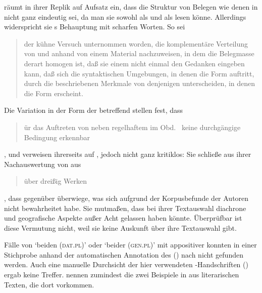 \citet[187]{gjelsten1980} räumt in ihrer Replik auf 
Aufsatz ein, dass die Struktur von Belegen wie denen in 
nicht ganz eindeutig sei, da man sie sowohl als  und als  lesen
könne. Allerdings widerspricht sie \citeauthor{askedal1974}s Behauptung mit
scharfen Worten. So sei \blockcquote[196]{gjelsten1980}{der kühne Versuch
unternommen worden, die komplementäre Verteilung
von  und  anhand von einem Material nachzuweisen, in dem
die Belegmasse derart homogen ist, daß sie einem nicht einmal den Gedanken
eingeben kann, daß sich die syntaktischen Umgebungen, in denen die Form
 auftritt, durch die beschriebenen Merkmale von denjenigen
unterscheiden, in denen die Form  erscheint.}

Die Variation in der Form der  betreffend stellen
\citet[628]{ksw2} fest, dass \blockquote{ür das Auftreten von
 neben regelhaftem  im Obd.\ \textelp{} keine
durchgängige Bedingung erkennbar }, und verweisen ihrerseits auf \citet{gjelsten1980}, jedoch nicht ganz
kritiklos: Sie schließe aus ihrer Nachauswertung von  aus
\blockcquote[198]{gjelsten1980}{über dreißig Werken}, dass 
gegenüber  überwiege, was sich aufgrund der
Korpusbefunde der Autoren nicht bewahrheitet habe. Sie mutmaßen,
dass \citeauthor{gjelsten1980} bei ihrer Textauswahl diachrone
und geografische Aspekte außer Acht gelassen haben könnte.
Überprüfbar ist diese Vermutung nicht, weil sie keine Auskunft über ihre
Textauswahl gibt.

Fälle von  `beiden (\textsc{dat.pl})' oder  `beider
(\textsc{gen.pl})' mit appositiver  konnten in
einer Stichprobe anhand der automatischen Annotation des
 (\CAO) nach \citet{schmid2019}
nicht gefunden werden. Auch eine manuelle Durchsicht der hier verwendeten
-Handschriften (\KC) ergab keine Treffer. \citet[626]{ksw2}
nennen zumindest die zwei Beispiele in  aus literarischen
Texten, die dort  vorkommen.

